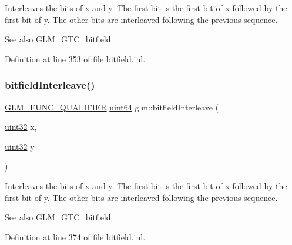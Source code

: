 Interleaves the bits of x and y. The first bit is the first bit of x followed by the first bit of y. The other bits are interleaved following the previous sequence.

\begin{DoxySeeAlso}{See also}
\mbox{\hyperlink{group__gtc__bitfield}{G\+L\+M\+\_\+\+G\+T\+C\+\_\+bitfield}} 
\end{DoxySeeAlso}


Definition at line 353 of file bitfield.\+inl.

\mbox{\label{group__gtc__bitfield_ga2bc87fd66f6f8471c1a46888360cef12}} 
\subsubsection{\texorpdfstring{bitfieldInterleave()}{bitfieldInterleave()}\hspace{0.1cm}{\footnotesize\ttfamily [6/16]}}
{\footnotesize\ttfamily \mbox{\hyperlink{setup_8hpp_a33fdea6f91c5f834105f7415e2a64407}{G\+L\+M\+\_\+\+F\+U\+N\+C\+\_\+\+Q\+U\+A\+L\+I\+F\+I\+ER}} \mbox{\hyperlink{group__gtc__type__precision_gae3632bf9b37da66233d78930dd06378a}{uint64}} glm\+::bitfield\+Interleave (\begin{DoxyParamCaption}\item[{\mbox{\hyperlink{group__gtc__type__precision_ga202b6a53c105fcb7e531f9b443518451}{uint32}}}]{x,  }\item[{\mbox{\hyperlink{group__gtc__type__precision_ga202b6a53c105fcb7e531f9b443518451}{uint32}}}]{y }\end{DoxyParamCaption})}

Interleaves the bits of x and y. The first bit is the first bit of x followed by the first bit of y. The other bits are interleaved following the previous sequence.

\begin{DoxySeeAlso}{See also}
\mbox{\hyperlink{group__gtc__bitfield}{G\+L\+M\+\_\+\+G\+T\+C\+\_\+bitfield}} 
\end{DoxySeeAlso}


Definition at line 374 of file bitfield.\+inl.

\mbox{\label{group__gtc__bitfield_ga6dee2ce1c45805063bb7fc5f6fd8f5ca}} 
